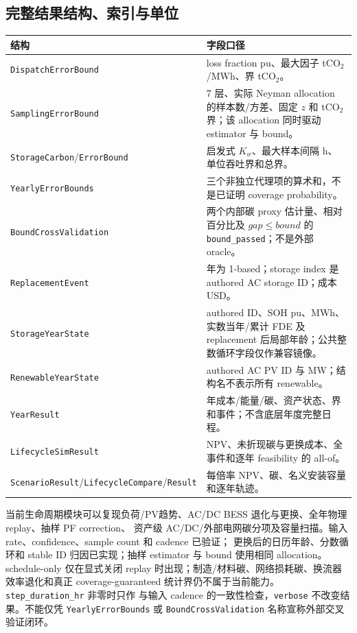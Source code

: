 \subsection{完整结果结构、索引与单位}
\begin{longtable}{@{}L{4.2cm}L{9.4cm}@{}}
\toprule
结构 & 字段口径\\ \midrule
\texttt{DispatchErrorBound} & loss fraction pu、最大因子 tCO$_2$/MWh、界 tCO$_2$。\\
\texttt{SamplingErrorBound} & 7 层、实际 Neyman allocation 的样本数/方差、固定 $z$ 和 tCO$_2$ 界；该 allocation 同时驱动 estimator 与 bound。\\
\texttt{StorageCarbon}/\newline\texttt{ErrorBound} & 启发式 $K_w$、最大样本间隔 h、单位吞吐界和总界。\\
\texttt{YearlyErrorBounds} & 三个非独立代理项的算术和，不是已证明 coverage probability。\\
\texttt{BoundCrossValidation} & 两个内部碳 proxy 估计量、相对百分比及 $gap\le bound$ 的 \texttt{bound\_passed}；不是外部 oracle。\\
\texttt{ReplacementEvent} & 年为 1-based；storage index 是 authored AC storage ID；成本 USD。\\
\texttt{StorageYearState} & authored ID、SOH pu、MWh、实数当年/累计 FDE 及 replacement 后局部年龄；公共整数循环字段仅作兼容镜像。\\
\texttt{RenewableYearState} & authored AC PV ID 与 MW；结构名不表示所有 renewable。\\
\texttt{YearResult} & 年成本/能量/碳、资产状态、界和事件；不含底层年度完整日程。\\
\texttt{LifecycleSimResult} & NPV、未折现碳与更换成本、全事件和逐年 feasibility 的 all-of。\\
\texttt{ScenarioResult}/\newline\texttt{LifecycleCompare}/\newline\texttt{Result} & 每倍率 NPV、碳、名义安装容量和逐年轨迹。\\
\bottomrule
\end{longtable}

\begin{gapnote}
当前生命周期模块可以复现负荷/PV趋势、AC/DC BESS 退化与更换、全年物理 replay、抽样 PF correction、
资产级 AC/DC/外部电网碳分项及容量扫描。输入 rate、confidence、sample count 和 cadence 已验证；
更换后的日历年龄、分数循环和 stable ID 归因已实现；抽样 estimator 与 bound 使用相同 allocation。
schedule-only 仅在显式关闭 replay 时出现；制造/材料碳、网络损耗碳、换流器效率退化和真正
coverage-guaranteed 统计界仍不属于当前能力。\texttt{step\_duration\_hr} 非零时只作
与输入 cadence 的一致性检查，\texttt{verbose} 不改变结果。不能仅凭 \texttt{YearlyErrorBounds} 或
\texttt{BoundCrossValidation} 名称宣称外部交叉验证闭环。
\end{gapnote}
